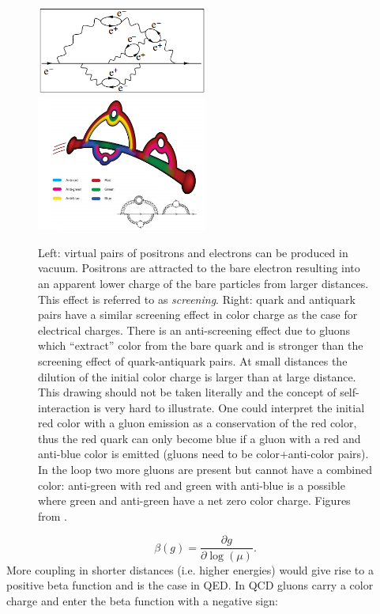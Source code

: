 \begin{figure}
\includegraphics[width=0.5\textwidth,height=0.3\textwidth]{chapter1/img/screening}
\includegraphics[width=0.5\textwidth,height=0.3\textwidth]{chapter1/img/antiscreening}
\caption{Left: virtual pairs of positrons and electrons can be produced in vacuum. Positrons are attracted to the bare electron resulting into an apparent lower charge of the bare particles from larger distances. This effect is referred to as \textit{screening}. Right: quark and antiquark pairs have a similar screening effect in color charge as the case for electrical charges. There is an anti-screening effect due to gluons which ``extract'' color from the bare quark and is stronger than the screening effect of quark-antiquark pairs. At small distances the dilution of the initial color charge is larger than at large distance.  This drawing should not be taken literally and the concept of self-interaction is very hard to illustrate. One could interpret the initial red color with a gluon emission as a conservation of the red color, thus the red quark can only become blue if a gluon with a red and anti-blue color is emitted (gluons need to be color+anti-color pairs). In the loop two more gluons are present but cannot have a combined color: anti-green with red and green with anti-blue is a possible where green and anti-green have a net zero color charge. Figures from \cite{Deur:2016tte}.}
\label{fig:screening}
\end{figure}

\begin{equation}
\beta\left(g\right) = \frac{\partial g}{\partial \log\left(\mu\right)}.
\end{equation}
More coupling in shorter distances (i.e. higher energies) would give rise to a positive beta function and is the case in QED. In QCD gluons carry a color charge and enter the beta function with a negative sign:

